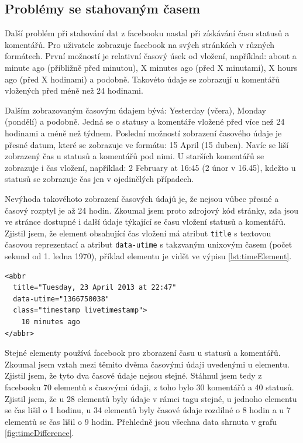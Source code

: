 \documentclass[thesis=M,czech]{FITthesis}[2013/05/10]
\begin{document}
\subsection{Problémy se stahovaným časem}

Další problém při stahování dat z facebooku nastal při získávání času statusů a komentářů. Pro uživatele zobrazuje facebook na svých stránkách v různých formátech. První možností je relativní časový úsek od vložení, například: about a minute ago (přibližně před minutou), X minutes ago (před X minutami), X hours ago (před X hodinami) a podobně. Takovéto údaje se zobrazují u komentářů vložených před méně než 24 hodinami. 

Dalším zobrazovaným časovým údajem bývá: Yesterday (včera), Monday (pondělí) a podobně. Jedná se o statusy a komentáře vložené před více než 24 hodinami a méně než týdnem. Poslední možností zobrazení časového údaje je přesné datum, které se zobrazuje ve formátu: 15 April (15 duben). Navíc se liší zobrazený čas u statusů a komentářů pod nimi. U starších komentářů se zobrazuje i čas vložení, například: 2 February at 16:45 (2 únor v 16.45), kdežto u statusů se zobrazuje čas jen v ojedinělých případech.

Nevýhoda takovéhoto zobrazení časových údajů je, že nejsou vůbec přesné a časový rozptyl je až 24 hodin. Zkoumal jsem proto zdrojový kód stránky, zda jsou ve stránce dostupné i další údaje týkající se času vložení statusů a komentářů. Zjistil jsem, že element obsahující čas vložení má atribut \verb|title| s textovou časovou reprezentací a atribut \verb|data-utime| s takzvaným unixovým časem (počet sekund od 1. ledna 1970), příklad elementu je vidět ve výpisu \ref{lst:timeElement}. 

\begin{lstlisting}[caption={Příklad elementu obsahující čas},label=lst:timeElement,belowcaptionskip=0.4cm]
<abbr 
  title="Tuesday, 23 April 2013 at 22:47"
  data-utime="1366750038" 
  class="timestamp livetimestamp">
    10 minutes ago
</abbr>
\end{lstlisting}

Stejné elementy používá facebook pro zborazení času u statusů a komentářů. Zkoumal jsem vztah mezi těmito dvěma časovými údaji uvedenými u elementu. Zjistil jsem, že tyto dva časové údaje nejsou stejné. Stáhnul jsem tedy z facebooku 70 elementů s časovými údaji, z toho bylo 30 komentářů a 40 statusů. Zjistil jsem, že u 28 elementů byly údaje v rámci tagu stejné, u jednoho elementu se čas lišil o 1 hodinu, u 34 elementů byly časové údaje rozdílné o 8 hodin a u 7 elementů se čas lišil o 9 hodin. Přehledně jsou všechna data shrnuta v grafu \ref{fig:timeDifference}.
\end{document}
